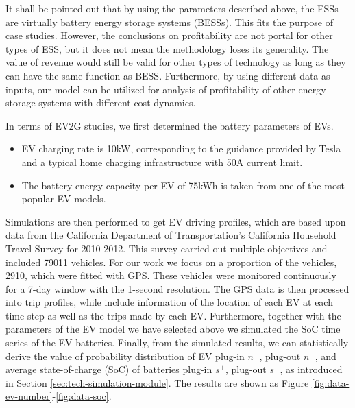 It shall be pointed out that by using the parameters described above, the ESSs are virtually battery energy storage systems (BESSs). This fits the purpose of case studies. However, the conclusions on profitability are not portal for other types of ESS, but it does not mean the methodology loses its generality. The value of revenue would still be valid for other types of technology as long as they can have the same function as BESS. Furthermore, by using different data as inputs, our model can be utilized for analysis of profitability of other energy storage systems with different cost dynamics. 

In terms of EV2G studies, we first determined the battery parameters of EVs.

\begin{itemize}
	\item EV charging rate is 10kW, corresponding to the guidance provided by Tesla\cite{Tesla2} and a typical home charging infrastructure with 50A current limit. 
	\item The battery energy capacity per EV of 75kWh is taken from one of the most popular EV models\cite{Tesla3}.
\end{itemize}

Simulations are then performed to get EV driving profiles, which are based upon data from the California Department of Transportation's California Household Travel Survey for 2010-2012\cite{NREL_TSDC}. This survey carried out multiple objectives and included 79011 vehicles. For our work we focus on a proportion of the vehicles, 2910, which were fitted with GPS. These vehicles were monitored continuously for a 7-day window with the 1-second resolution. The GPS data is then processed into trip profiles, while include information of the location of each EV at each time step as well as the trips made by each EV. Furthermore, together with the parameters of the EV model we have selected above we simulated the SoC time series of the EV batteries. Finally, from the simulated results, we can statistically derive the value of probability distribution of EV plug-in $n^+$, plug-out $n^-$, and average state-of-charge (SoC) of batteries plug-in $s^+$, plug-out $s^-$, as introduced in Section \ref{sec:tech-simulation-module}. The results are shown as Figure \ref{fig:data-ev-number}-\ref{fig:data-soc}.

